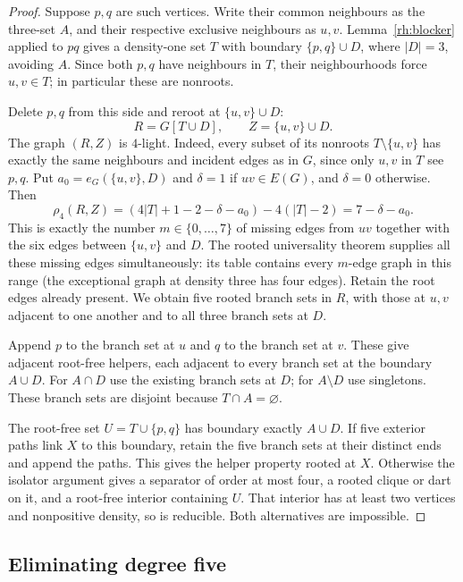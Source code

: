 \begin{proof}
Suppose $p,q$ are such vertices. Write their common neighbours as the
three-set $A$, and their respective exclusive neighbours as $u,v$.
Lemma~\ref{rh:blocker} applied to $pq$ gives a density-one set $T$
with boundary $\{p,q\}\cup D$, where $|D|=3$, avoiding $A$.
Since both $p,q$ have neighbours in $T$, their neighbourhoods force
$u,v\in T$; in particular these are nonroots.

Delete $p,q$ from this side and reroot at $\{u,v\}\cup D$:
\[
 R=G[T\cup D],\qquad Z=\{u,v\}\cup D.
\]
The graph $(R,Z)$ is $4$-light. Indeed, every subset of its nonroots
$T\setminus\{u,v\}$ has exactly the same neighbours and incident
edges as in $G$, since only $u,v$ in $T$ see $p,q$.
Put $a_0=e_G(\{u,v\},D)$ and $\delta=1$ if $uv\in E(G)$, and
$\delta=0$ otherwise. Then
\[
 \rho_4(R,Z)
 =(4|T|+1-2-\delta-a_0)-4(|T|-2)
 =7-\delta-a_0.
\]
This is exactly the number $m\in\{0,\ldots,7\}$ of missing edges
from $uv$ together with the six edges between $\{u,v\}$ and $D$.
The rooted universality theorem \cite[Theorem~2.6]{DNR2026} supplies
all these missing edges simultaneously: its table contains every
$m$-edge graph in this range (the exceptional graph at density three
has four edges). Retain the root edges already present. We obtain
five rooted branch sets in $R$, with those at $u,v$ adjacent to one
another and to all three branch sets at $D$.

Append $p$ to the branch set at $u$ and $q$ to the branch set at $v$.
These give adjacent root-free helpers, each adjacent to every branch
set at the boundary $A\cup D$. For $A\cap D$ use the existing branch
sets at $D$; for $A\setminus D$ use singletons. These branch sets are
disjoint because $T\cap A=\varnothing$.

The root-free set $U=T\cup\{p,q\}$ has boundary exactly $A\cup D$.
If five exterior paths link $X$ to this boundary, retain the five branch
sets at their distinct ends and append the paths. This gives the helper
property rooted at $X$. Otherwise the isolator argument gives a
separator of order at most four, a rooted clique or dart on it, and a
root-free interior containing $U$. That interior has at least two
vertices and nonpositive density, so is reducible. Both alternatives
are impossible.
\end{proof}

\subsection{Eliminating degree five}

